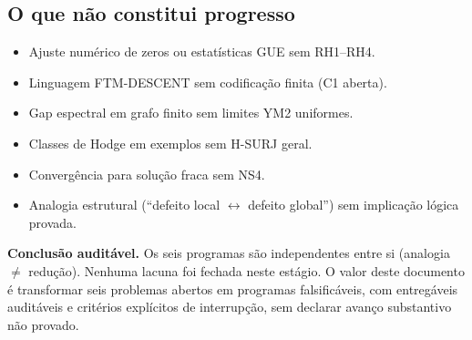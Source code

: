 \documentclass[11pt,a4paper]{article}
\begin{document}
\subsection{O que não constitui progresso}

\begin{itemize}[leftmargin=2em]
\item Ajuste numérico de zeros ou estatísticas GUE sem RH1–RH4.
\item Linguagem FTM-DESCENT sem codificação finita (C1 aberta).
\item Gap espectral em grafo finito sem limites YM2 uniformes.
\item Classes de Hodge em exemplos sem H-SURJ geral.
\item Convergência para solução fraca sem NS4.
\item Analogia estrutural (``defeito local $\leftrightarrow$ defeito global'')
  sem implicação lógica provada.
\end{itemize}

\bigskip\noindent
\textbf{Conclusão auditável.}
Os seis programas são independentes entre si (analogia $\neq$ redução).
Nenhuma lacuna foi fechada neste estágio.
O valor deste documento é transformar seis problemas abertos em
programas falsificáveis, com entregáveis auditáveis e critérios
explícitos de interrupção, sem declarar avanço substantivo não provado.
\end{document}
